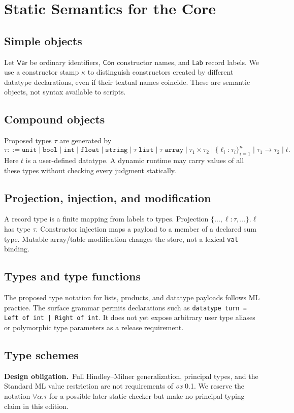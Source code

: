 \documentclass[11pt,oneside,openany]{book}
\newcommand{\ox}{\textit{ox}}
\newcommand{\kw}[1]{\texttt{#1}}
\newcommand{\pending}{\textbf{Design obligation.}\ }
\begin{document}
\chapter{Static Semantics for the Core}
\section{Simple objects}
Let $\mathsf{Var}$ be ordinary identifiers, $\mathsf{Con}$ constructor names, and $\mathsf{Lab}$ record labels. We use a constructor stamp $\kappa$ to distinguish constructors created by different datatype declarations, even if their textual names coincide. These are semantic objects, not syntax available to scripts.

\section{Compound objects}
Proposed types $\tau$ are generated by
\[
\tau ::= \mathtt{unit}\mid\mathtt{bool}\mid\mathtt{int}\mid\mathtt{float}\mid\mathtt{string}
\mid \tau\;\mathtt{list}\mid\tau\;\mathtt{array}\mid\tau_1\times\tau_2
\mid \{\ell_i:\tau_i\}_{i=1}^n\mid\tau_1\to\tau_2\mid t.
\]
Here $t$ is a user-defined datatype. A dynamic runtime may carry values of all these types without checking every judgment statically.

\section{Projection, injection, and modification}
A record type is a finite mapping from labels to types. Projection $\{\ldots,\ell:\tau,\ldots\}.\ell$ has type $\tau$. Constructor injection maps a payload to a member of a declared sum type. Mutable array/table modification changes the store, not a lexical \kw{val} binding.

\section{Types and type functions}
The proposed type notation for lists, products, and datatype payloads follows ML practice. The surface grammar permits declarations such as \kw{datatype turn = Left of int | Right of int}. It does not yet expose arbitrary user type aliases or polymorphic type parameters as a release requirement.

\section{Type schemes}
\pending Full Hindley--Milner generalization, principal types, and the Standard ML value restriction are not requirements of \ox{} 0.1. We reserve the notation $\forall\alpha.\tau$ for a possible later static checker but make no principal-typing claim in this edition.
\end{document}

